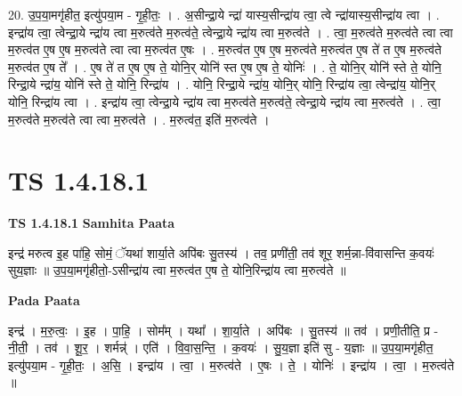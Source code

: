 \documentclass[17pt]{extarticle}
\begin{document}
20. उ॒प॒या॒मगृ॑हीत॒ इत्यु॑पया॒म - गृ॒ही॒तः॒ । . अ॒सीन्द्रा॒ये न्द्रा॑ यास्य॒सीन्द्रा॑य त्वा॒ त्वे न्द्रा॑यास्य॒सीन्द्रा॑य त्वा । . इन्द्रा॑य त्वा॒ त्वेन्द्रा॒ये न्द्रा॑य त्वा म॒रुत्व॑ते म॒रुत्व॑ते॒ त्वेन्द्रा॒ये न्द्रा॑य त्वा म॒रुत्व॑ते । . त्वा॒ म॒रुत्व॑ते म॒रुत्व॑ते त्वा त्वा म॒रुत्व॑त ए॒ष ए॒ष म॒रुत्व॑ते त्वा त्वा म॒रुत्व॑त ए॒षः । . म॒रुत्व॑त ए॒ष ए॒ष म॒रुत्व॑ते म॒रुत्व॑त ए॒ष ते॑ त ए॒ष म॒रुत्व॑ते म॒रुत्व॑त ए॒ष ते᳚ । . ए॒ष ते॑ त ए॒ष ए॒ष ते॒ योनि॒र् योनि॑ स्त ए॒ष ए॒ष ते॒ योनिः॑ । . ते॒ योनि॒र् योनि॑ स्ते ते॒ योनि॒ रिन्द्रा॒ये न्द्रा॑य॒ योनि॑ स्ते ते॒ योनि॒ रिन्द्रा॑य । . योनि॒ रिन्द्रा॒ये न्द्रा॑य॒ योनि॒र् योनि॒ रिन्द्रा॑य त्वा॒ त्वेन्द्रा॑य॒ योनि॒र् योनि॒ रिन्द्रा॑य त्वा । . इन्द्रा॑य त्वा॒ त्वेन्द्रा॒ये न्द्रा॑य त्वा म॒रुत्व॑ते म॒रुत्व॑ते॒ त्वेन्द्रा॒ये न्द्रा॑य त्वा म॒रुत्व॑ते । . त्वा॒ म॒रुत्व॑ते म॒रुत्व॑ते त्वा त्वा म॒रुत्व॑ते । . म॒रुत्व॑त॒ इति॑ म॒रुत्व॑ते । \newline
\pagebreak
{}

\section{ TS 1.4.18.1 }

\textbf{TS 1.4.18.1 } \newline
\textbf{Samhita Paata} \newline

इन्द्र॑ मरुत्व इ॒ह पा॑हि॒ सोमं॒ ॅयथा॑ शार्या॒ते अपि॑बः सु॒तस्य॑ । तव॒ प्रणी॑ती॒ तव॑ शूर॒ शर्म॒न्ना-वि॑वासन्ति क॒वयः॑ सुय॒ज्ञाः ॥ उ॒प॒या॒मगृ॑हीतो॒-ऽसीन्द्रा॑य त्वा म॒रुत्व॑त ए॒ष ते॒ योनि॒रिन्द्रा॑य त्वा म॒रुत्व॑ते ॥ \newline

\textbf{Pada Paata} \newline

इन्द्र॑ । म॒रु॒त्वः॒ । इ॒ह । पा॒हि॒ । सोम᳚म् । यथा᳚ । शा॒र्या॒ते । अपि॑बः । सु॒तस्य॑ ॥ तव॑ । प्रणी॒तीति॒ प्र - नी॒ती॒ । तव॑ । शू॒र॒ । शर्मन्न्॑ । एति॑ । वि॒वा॒स॒न्ति॒ । क॒वयः॑ । सु॒य॒ज्ञा इति॑ सु - य॒ज्ञाः ॥ उ॒प॒या॒मगृ॑हीत॒ इत्यु॑पया॒म - गृ॒ही॒तः॒ । अ॒सि॒ । इन्द्रा॑य । त्वा॒ । म॒रुत्व॑ते । ए॒षः । ते॒ । योनिः॑ । इन्द्रा॑य । त्वा॒ । म॒रुत्व॑ते ॥  \newline
\end{document}
